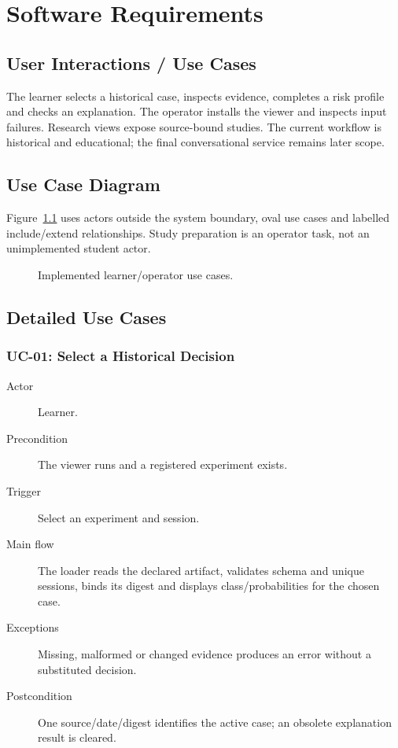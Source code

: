 \chapter{Software Requirements}
\section{User Interactions / Use Cases}
The learner selects a historical case, inspects evidence, completes a risk profile and checks an explanation. The operator installs the viewer and inspects input failures. Research views expose source-bound studies. The current workflow is historical and educational; the final conversational service remains later scope.
\section{Use Case Diagram}
Figure~\ref{fig:usecases} uses actors outside the system boundary, oval use cases and labelled include/extend relationships. Study preparation is an operator task, not an unimplemented student actor.
\begin{figure}[htbp]\centering\caption{Implemented learner/operator use cases.}\label{fig:usecases}\end{figure}
\section{Detailed Use Cases}
\subsection{UC-01: Select a Historical Decision}
\begin{description}
\item[Actor] Learner.
\item[Precondition] The viewer runs and a registered experiment exists.
\item[Trigger] Select an experiment and session.
\item[Main flow] The loader reads the declared artifact, validates schema and unique sessions, binds its digest and displays class/probabilities for the chosen case.
\item[Exceptions] Missing, malformed or changed evidence produces an error without a substituted decision.
\item[Postcondition] One source/date/digest identifies the active case; an obsolete explanation result is cleared.
\end{description}
